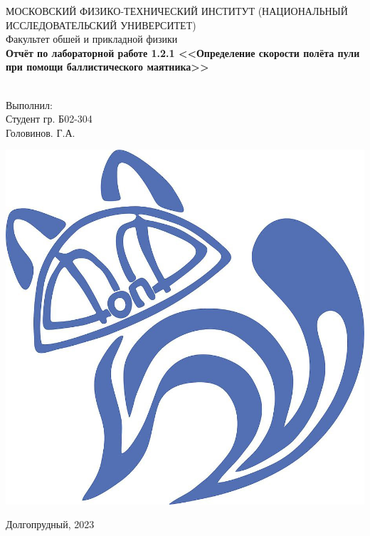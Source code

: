 

\begin{titlepage}
	\begin{center}
		МОСКОВСКИЙ ФИЗИКО-ТЕХНИЧЕСКИЙ ИНСТИТУТ (НАЦИОНАЛЬНЫЙ ИССЛЕДОВАТЕЛЬСКИЙ УНИВЕРСИТЕТ) \\
		
		
		\hfill \break
		Факультет обшей и прикладной физики\\
		\vspace{2.5cm}
		\large{\textbf{Отчёт по лабораторной работе 1.2.1 <<Определение скорости полёта пули при помощи баллистического маятника>>}}\\
		\hfill \break
		\\
	\end{center}
	
	\begin{flushright}
		Выполнил:\\
		Студент гр. Б02-304\\
		Головинов. Г.А.
	\end{flushright}
	
	\vspace{7cm}
	
	\begin{center}
		\includegraphics[width=0.15\linewidth]{uni}
	\end{center}
	

	

	\vfill
	
	\begin{center} Долгопрудный, 2023 \end{center}
	
	\thispagestyle{empty}
	
\end{titlepage}

